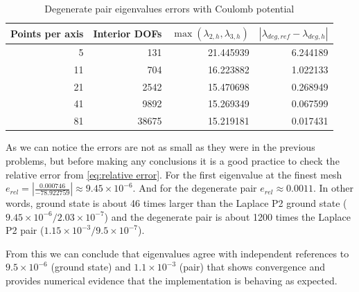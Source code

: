 \documentclass[conference]{IEEEtran}
\begin{document}
\begin{table}[H]
    \centering
    \caption{Degenerate pair eigenvalues errors with Coulomb potential}
    \label{tab:degenerate pair errors}
    \begin{tabular}{rrrr}
        \toprule
        Points per axis & Interior DOFs & $\max(\lambda_{2,h}, \lambda_{3,h})$ & $|\lambda_{deg,ref} - \lambda_{deg,h}|$ \\
        \midrule
        5 & 131 & 21.445939 & 6.244189 \\
        11 & 704 & 16.223882 & 1.022133 \\
        21 & 2542 & 15.470698 & 0.268949 \\
        41 & 9892 & 15.269349 & 0.067599 \\
        81 & 38675 & 15.219181 & 0.017431 \\
        \bottomrule
    \end{tabular}
\end{table}

As we can notice the errors are not as small as they were in the previous problems, but before making any conclusions it is a good practice to check the relative error from \ref{eq:relative error}. For the first eigenvalue at the finest mesh $e_{rel} = |\frac{0.000746}{-78.922759}| \approx 9.45 \times 10^{-6}$. And for the degenerate pair $e_{rel} \approx 0.0011$. In other words, ground state is about 46 times larger than the Laplace P2 ground state ($9.45 \times 10^{-6} / 2.03 \times 10^{-7}$) and the degenerate pair is about 1200 times the Laplace P2 pair ($1.15 \times 10^{-3} / 9.5 \times 10^{-7}$).
 
From this we can conclude that eigenvalues agree with independent references to $9.5 \times 10^{-6}$ (ground state) and $1.1 \times 10^{-3}$ (pair) that shows convergence and provides numerical evidence that the implementation is behaving as expected.
\end{document}
